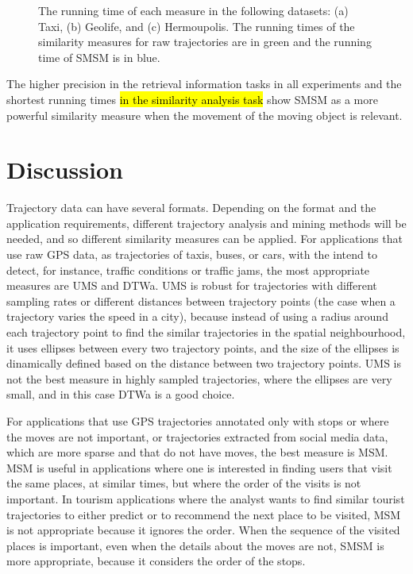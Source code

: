\begin{figure}[ht!]
\begin{subfigure}[c]{0.5\textwidth}
        \caption{}
        \label{fig:running_time_hermoupolis}
    \end{subfigure}\hfill %
    \caption{The running time of each measure in the following datasets: (a) Taxi, (b) Geolife, and (c) Hermoupolis. The running times of the similarity measures for raw trajectories are in green and the running time of SMSM is in blue.}
    \label{fig:running_time_graphs}
\end{figure}

The higher precision in the retrieval information tasks in all experiments and the shortest running times \hl{in the similarity analysis task} show SMSM as a more powerful similarity measure when the movement of the moving object is relevant.

\section{Discussion}\label{sec:discussion}

{Trajectory data can have several formats. Depending on the format and the application requirements, different trajectory analysis and mining methods will be needed, and so different similarity measures can be applied. For applications that use raw GPS data, as trajectories of taxis, buses, or cars, with the intend to detect, for instance, traffic conditions or traffic jams, the most appropriate measures are UMS and DTWa. UMS is robust for trajectories with different sampling rates or different distances between trajectory points (the case when a trajectory varies the speed in a city), because instead of using a radius around each trajectory point to find the similar trajectories in the spatial neighbourhood, it uses ellipses between every two trajectory points, and the size of the ellipses is dinamically defined based on the distance between two trajectory points. UMS is not the best measure in highly sampled trajectories, where the ellipses are very small, and in this case DTWa is  a good choice.}

{For applications that use GPS trajectories annotated only with stops or where the moves are not important, or trajectories extracted from social media data, which are more sparse and that do not have moves, the best measure is MSM. MSM is useful in applications where one is interested in finding users that visit the same places, at similar times, but where the order of the visits is not important. In tourism applications where the analyst wants to find similar tourist trajectories to either predict or to recommend the next place to be visited, MSM is not appropriate because it ignores the order. When the sequence of the visited places is important, even when the details about the moves are not, SMSM is more appropriate, because it considers the order of the stops.}

